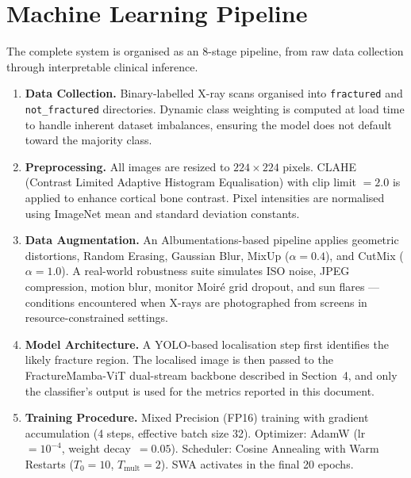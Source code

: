 \documentclass[12pt, a4paper]{article}
\begin{document}
\section{Machine Learning Pipeline}

The complete system is organised as an 8-stage pipeline, from raw data collection through
interpretable clinical inference.

\begin{enumerate}[label=\textbf{Stage \arabic*.}, leftmargin=*, itemsep=6pt]

  \item \textbf{Data Collection.}
  Binary-labelled X-ray scans organised into \texttt{fractured} and \texttt{not\_fractured}
  directories. Dynamic class weighting is computed at load time to handle inherent dataset
  imbalances, ensuring the model does not default toward the majority class.

  \item \textbf{Preprocessing.}
  All images are resized to $224\times224$ pixels. CLAHE (Contrast Limited Adaptive Histogram
  Equalisation) with clip limit $= 2.0$ is applied to enhance cortical bone contrast. Pixel
  intensities are normalised using ImageNet mean and standard deviation constants.

  \item \textbf{Data Augmentation.}
  An Albumentations-based pipeline applies geometric distortions, Random Erasing, Gaussian Blur,
  MixUp ($\alpha=0.4$), and CutMix ($\alpha=1.0$). A real-world robustness suite simulates ISO
  noise, JPEG compression, motion blur, monitor Moir\'{e} grid dropout, and sun flares —
  conditions encountered when X-rays are photographed from screens in resource-constrained settings.

  \item \textbf{Model Architecture.}
  A YOLO-based localisation step first identifies the likely fracture region. The localised image
  is then passed to the FractureMamba-ViT dual-stream backbone described in Section~4, and only
  the classifier's output is used for the metrics reported in this document.

  \item \textbf{Training Procedure.}
  Mixed Precision (FP16) training with gradient accumulation (4 steps, effective batch size 32).
  Optimizer: AdamW (lr~$=10^{-4}$, weight decay~$=0.05$). Scheduler: Cosine Annealing with Warm
  Restarts ($T_0=10$, $T_\text{mult}=2$). SWA activates in the final 20 epochs.


\end{enumerate}
\end{document}
